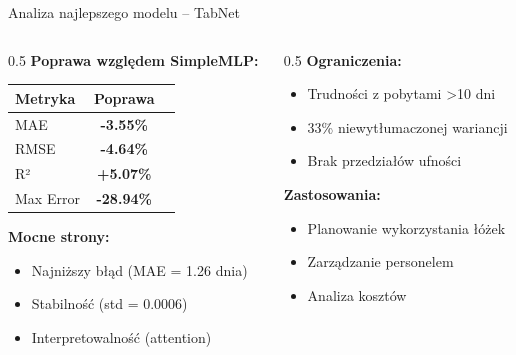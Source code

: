 \documentclass[aspectratio=169,12pt]{beamer}
\begin{document}
\begin{frame}{Analiza najlepszego modelu -- TabNet}
    \begin{columns}[T]
        \begin{column}{0.5\textwidth}
            \textbf{Poprawa względem SimpleMLP:}
            \vspace{0.2cm}

            \small
            \begin{tabular}{lcc}
                \toprule
                Metryka   & Poprawa           \\
                \midrule
                MAE       & \textbf{-3.55\%}  \\
                RMSE      & \textbf{-4.64\%}  \\
                R²        & \textbf{+5.07\%}  \\
                Max Error & \textbf{-28.94\%} \\
                \bottomrule
            \end{tabular}

            \vspace{0.5cm}
            \textbf{Mocne strony:}
            \begin{itemize}
                \item Najniższy błąd (MAE = 1.26 dnia)
                \item Stabilność (std = 0.0006)
                \item Interpretowalność (attention)
            \end{itemize}
        \end{column}
        \begin{column}{0.5\textwidth}
            \textbf{Ograniczenia:}
            \begin{itemize}
                \item Trudności z pobytami >10 dni
                \item 33\% niewytłumaczonej wariancji
                \item Brak przedziałów ufności
            \end{itemize}

            \vspace{0.5cm}
            \textbf{Zastosowania:}
            \begin{itemize}
                \item Planowanie wykorzystania łóżek
                \item Zarządzanie personelem
                \item Analiza kosztów
            \end{itemize}
        \end{column}
    \end{columns}
\end{frame}
\end{document}
